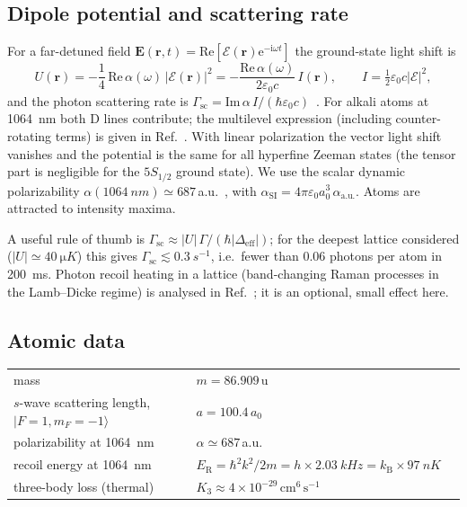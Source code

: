 \documentclass[11pt,a4paper]{article}
\newcommand{\ee}{\mathrm{e}}
\newcommand{\ii}{\mathrm{i}}
\newcommand{\kB}{k_\mathrm{B}}
\newcommand{\ER}{E_\mathrm{R}}
\begin{document}
\subsection{Dipole potential and scattering rate}

For a far-detuned field $\bm E(\bm r,t)=\mathrm{Re}[\bm{\mathcal E}(\bm r)\ee^{-\ii\omega t}]$ the ground-state light shift is
\begin{equation}
U(\bm r) = -\frac{1}{4}\,\mathrm{Re}\,\alpha(\omega)\,|\bm{\mathcal E}(\bm r)|^2
         = -\frac{\mathrm{Re}\,\alpha(\omega)}{2\varepsilon_0 c}\, I(\bm r),
\qquad I=\tfrac12\varepsilon_0 c|\bm{\mathcal E}|^2 ,
\label{eq:Udip}
\end{equation}
and the photon scattering rate is $\Gamma_\mathrm{sc}=\mathrm{Im}\,\alpha\, I/(\hbar\varepsilon_0 c)$~\cite{Grimm2000}. For alkali atoms at \SI{1064}{nm} both D lines contribute; the multilevel expression (including counter-rotating terms) is given in Ref.~\cite{Grimm2000}. With linear polarization the vector light shift vanishes and the potential is the same for all hyperfine Zeeman states (the tensor part is negligible for the $5S_{1/2}$ ground state). We use the scalar dynamic polarizability $\alpha(\SI{1064}{nm})\simeq 687\,$a.u.~\cite{Safronova2006}, with $\alpha_\mathrm{SI}=4\pi\varepsilon_0 a_0^3\,\alpha_\mathrm{a.u.}$. Atoms are attracted to intensity maxima.

A useful rule of thumb is $\Gamma_\mathrm{sc}\approx |U|\,\Gamma/(\hbar|\Delta_\mathrm{eff}|)$; for the deepest lattice considered ($|U|\simeq\SI{40}{\micro K}$) this gives $\Gamma_\mathrm{sc}\lesssim\SI{0.3}{s^{-1}}$, i.e.\ fewer than 0.06 photons per atom in \SI{200}{ms}. Photon recoil heating in a lattice (band-changing Raman processes in the Lamb--Dicke regime) is analysed in Ref.~\cite{Gerbier2010}; it is an optional, small effect here.

\subsection{Atomic data}
\begin{center}
\begin{tabular}{@{}lll@{}}
\toprule
mass & $m=86.909\,$u & \cite{Steck87}\\
$s$-wave scattering length, $|F{=}1,m_F{=}{-}1\rangle$ & $a=100.4\,a_0$ & \cite{vanKempen2002}\\
polarizability at \SI{1064}{nm} & $\alpha\simeq 687\,$a.u. & \cite{Safronova2006}\\
recoil energy at \SI{1064}{nm} & $\ER=\hbar^2k^2/2m=h\times\SI{2.03}{kHz}=\kB\times\SI{97}{nK}$ & \\
three-body loss (thermal) & $K_3\approx 4\times10^{-29}\,\mathrm{cm^6\,s^{-1}}$ & \cite{Burt1997}\\
\bottomrule
\end{tabular}
\end{center}
\end{document}
